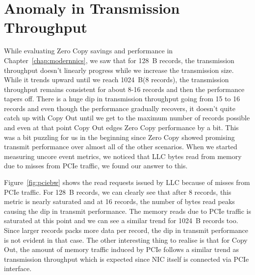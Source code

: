 


\section{Anomaly in Transmission Throughput}
While evaluating Zero Copy savings and performance in Chapter~\ref{chap:modernnics}, we saw that for 128~B records, the transmission throughput doesn't linearly progress 
while we increase the transmission size. While it trends upward until we reach 1024~B(8 records), the transmission throughput remains consistent for about 8-16 records and 
then the performance tapers off. There is a huge dip in transmission throughput going from 15 to 16 records and even though the performance gradually recovers, it doesn't quite 
catch up with Copy Out until we get to the maximum number of records possible and even at that point Copy Out edges Zero Copy performance by a bit. This was a bit puzzling 
for us in the beginning since Zero Copy showed promising transmit performance over almost all of the other scenarios. When we started measuring uncore event metrics, we noticed 
that LLC bytes read from memory due to misses from PCIe traffic, we found our answer to this.




Figure~\ref{fig:pciebw} shows the read requests issued by LLC because of misses from PCIe traffic. For 128~B records, we can clearly see that after 8 records, this metric is 
nearly saturated and at 16 records, the number of bytes read peaks causing the dip in transmit performance. The memory reads due to PCIe traffic is saturated at this point and 
we can see a similar trend for 1024~B records too. Since larger records packs more data per record, the dip in transmit performance is not evident in that case. The other interesting 
thing to realise is that for Copy Out, the amount of memory traffic induced by PCIe follows a similar trend as transmission throughput which is expected since 
NIC itself is connected via PCIe interface.



